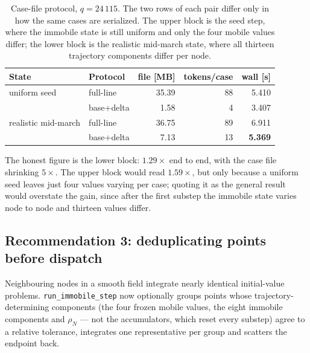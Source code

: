 \documentclass[11pt,a4paper]{article}
\newcommand{\code}[1]{\texttt{\small #1}}
\begin{document}
\begin{table}[htb]
\centering
\caption{Case-file protocol, $q=24\,115$. The two rows of each pair differ only
in how the same cases are serialized. The upper block is the seed step, where
the immobile state is still uniform and only the four mobile values differ; the
lower block is the realistic mid-march state, where all thirteen trajectory
components differ per node.}
\label{tab:rec2}
\begin{tabular}{llrrr}
\toprule
State & Protocol & file [MB] & tokens/case & wall [s] \\
\midrule
uniform seed        & full-line  & 35.39 & 88 & 5.410 \\
                    & base+delta &  1.58 &  4 & 3.407 \\
\addlinespace
realistic mid-march & full-line  & 36.75 & 89 & 6.911 \\
                    & base+delta &  7.13 & 13 & \textbf{5.369} \\
\bottomrule
\end{tabular}
\end{table}

The honest figure is the lower block: \textbf{$1.29\times$} end to end, with the
case file shrinking $5\times$. The upper block would read $1.59\times$, but only
because a uniform seed leaves just four values varying per case; quoting it as
the general result would overstate the gain, since after the first substep the
immobile state varies node to node and thirteen values differ.

\subsection{Recommendation 3: deduplicating points before dispatch}
\label{sec:dedup}

Neighbouring nodes in a smooth field integrate nearly identical initial-value
problems. \code{run\_immobile\_step} now optionally groups points whose
trajectory-determining components (the four frozen mobile values, the eight
immobile components and $\rho_N$ --- not the accumulators, which reset every
substep) agree to a relative tolerance, integrates one representative per group
and scatters the endpoint back.
\end{document}
